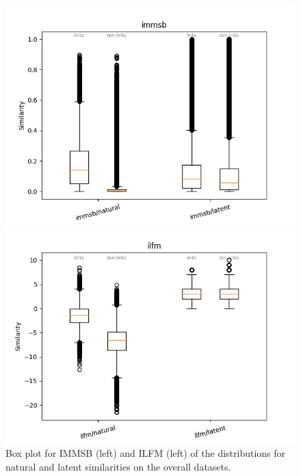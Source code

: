 \begin{figure}[h]
    \centering
        \begin{minipage}{0.24\textwidth}
            \includegraphics[width=\textwidth]{img/corpus/homo_mustach_immsb}
        \end{minipage}
        \begin{minipage}{0.24\textwidth}
            \includegraphics[width=\textwidth]{img/corpus/homo_mustach_ilfm}
        \end{minipage}
        \caption{Box plot for IMMSB (left) and ILFM (left) of the distributions for natural and latent similarities on the overall datasets. }
        \label{fig:homo_mustach}
\end{figure}



